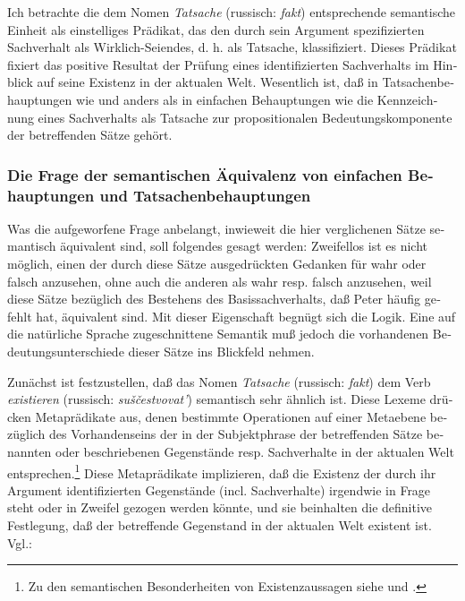 \documentclass[output=paper]{langscibook}
\begin{document}
\begin{otherlanguage}{german}
Ich betrachte die dem Nomen \textit{Tatsache}  (russisch: \textit{fakt}) entsprechende semantische Einheit als einstelliges Prädikat, das den durch sein Argument spe\-zi\-fi\-zier\-ten Sachverhalt als Wirklich-Seiendes, d. h. als Tatsache, klassifiziert. Dieses Prädikat fixiert das positive Resultat der Prüfung eines identifizierten Sachverhalts im Hinblick auf seine Existenz in der aktualen Welt. Wesentlich ist, daß in Tatsachenbehauptungen wie  und  anders als in einfachen Behauptungen wie  die Kennzeichnung eines Sachverhalts als Tatsache zur propositionalen Bedeutungskomponente der betreffenden Sätze gehört.

\subsubsection{Die Frage der semantischen Äquivalenz von einfachen Behauptungen und Tatsachenbehauptungen} \label{sec:zi83:3.4.3}
\largerpage

Was die aufgeworfene Frage anbelangt, inwieweit die hier verglichenen Sätze semantisch äquivalent sind, soll folgendes gesagt werden: Zweifellos ist es nicht möglich, einen der durch diese Sätze ausgedrückten Gedanken für wahr oder falsch anzusehen, ohne auch die anderen als wahr resp. falsch anzusehen, weil diese Sätze bezüglich des Bestehens des Basissachverhalts, daß Peter häufig ge\-fehlt hat, äquivalent sind. Mit dieser Eigenschaft begnügt sich die Logik. Eine auf die natürliche Sprache zugeschnittene Semantik muß jedoch die vorhandenen Bedeutungsunterschiede dieser Sätze ins Blickfeld nehmen.

Zunächst ist festzustellen, daß das Nomen \textit{Tatsache} (russisch: \textit{fakt}) dem Verb \textit{existieren} (russisch: \textit{suščestvovat’}) semantisch sehr ähnlich ist. Diese Lexeme drücken Metaprädikate aus, denen bestimmte Operationen auf einer Metaebene be\-züg\-lich des Vorhandenseins der in der Subjektphrase der betreffenden Sätze benannten oder beschriebenen Gegenstände resp. Sachverhalte in der aktualen Welt ent\-spre\-chen.\footnote{Zu den semantischen Besonderheiten von Existenzaussagen siehe \citet[205 ff., 264 ff.]{arutjunova1976predlozenie-i-ego-smysl:-logiko-semanticeskie-problemy} und \citet[25]{arutjunova1976referencija-imeni-i-struktura-predlozenija}.} Diese Metaprädikate implizieren, daß die Existenz der durch ihr Argument identifizierten Gegenstände (incl. Sachverhalte) irgendwie in Frage steht oder in Zweifel gezogen werden könnte, und sie beinhalten die definitive Festlegung, daß der betreffende Gegenstand in der aktualen Welt existent ist. Vgl.:


\end{otherlanguage}
\end{document}
